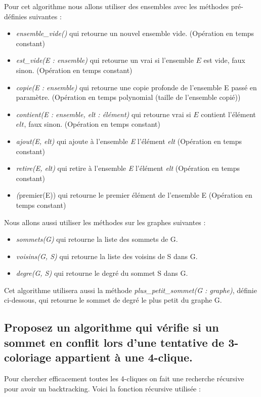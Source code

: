 \documentclass[a4paper, 11pt]{article}
\begin{document}
    Pour cet algorithme nous allons utiliser des ensembles avec les méthodes pré-définies suivantes :
    \begin{itemize}
        \item \emph{ensemble\_vide()} qui retourne un nouvel ensemble vide. (Opération en temps constant)
        \item \emph{est\_vide(E : ensemble)} qui retourne un vrai si l'ensemble $E$ est vide, faux sinon. (Opération en temps constant)
        \item \emph{copie(E : ensemble)} qui retourne une copie profonde de l'ensemble E passé en paramètre. (Opération en temps polynomial (taille de l'ensemble copié))
        \item \emph{contient(E : ensemble, elt : élément)} qui retourne vrai si $E$ contient l'élément $elt$, faux sinon. (Opération en temps constant)
        \item \emph{ajout(E, elt)} qui ajoute à l'ensemble \emph{E} l'élément \emph{elt} (Opération en temps constant)
        \item \emph{retire(E, elt)} qui retire à l'ensemble \emph{E} l'élément \emph{elt} (Opération en temps constant)
        \item \emph(premier(E)) qui retourne le premier élément de l'ensemble E (Opération en temps constant)
    \end{itemize}

    Nous allons aussi utiliser les méthodes sur les graphes suivantes :
    \begin{itemize}
        \item \emph{sommets(G)} qui retourne la liste des sommets de G\@.
        \item \emph{voisins(G, S)} qui retourne la liste des voisins de S dans G\@.
        \item \emph{degre(G, S)} qui retourne le degré du sommet S dans G\@.
    \end{itemize}

    \bigskip
    Cet algorithme utilisera aussi la méthode \emph{plus\_petit\_sommet(G : graphe)},
    définie ci-dessous, qui retourne le sommet de degré le plus petit du graphe G\@.
    \newpage
    
    

    \subsection{Proposez un algorithme qui vérifie si un sommet en conflit lors d’une tentative de 3-coloriage
    appartient à une 4-clique.}\label{subsec:Q3C}
    Pour chercher efficacement toutes les 4-cliques on fait une recherche récursive pour avoir un backtracking.
    Voici la fonction récursive utilisée :
    
\end{document}
